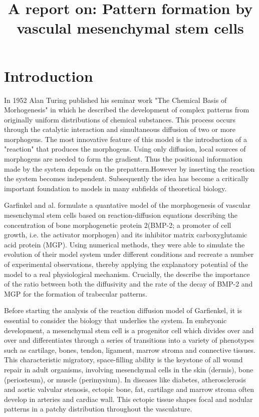 \documentclass[12pt]{article}
\title{A report on: Pattern formation by vasculal mesenchymal stem cells}
\date{\vspace{-5ex}}
\begin{document}
	
	\maketitle
	
	\section{Introduction}
	
  In 1952 Alan Turing published his seminar work "The Chemical Basis of Morhogenesis" in which he described the development of complex patterns from originally uniform distributions of chemical substances. This process occurs through the catalytic interaction and simultaneous diffusion of two or more morphogens. The most innovative feature of this model is the introduction of a "reaction" that produces the morphogens. Using only diffusion, local sources of morphogens are needed to form the gradient. Thus the positional information made by the system depends on the prepattern.However by inserting the reaction the system becomes independent. Subsequently the idea has become a critically important foundation to models in many subfields of theoretical biology.
  
  Garfinkel and al. formulate a quantative model of the morphogenesis of vascular mesenchymal stem cells based on reaction-diffusion equations describing the concentration of bone morphogenetic protein 2(BMP-2; a promoter of cell growth, i.e. the activator morphogen) and its inhibitor matrix carboxyglutamic acid protein (MGP). Using numerical methods, they were able to simulate the evolution of their model system under different conditions and recreate a number of experimental observations, thereby applying the explanatory potential of the model to a real physiological mechanism. Crucially, the describe the importance of the ratio between both the diffusivity and the rate of the decay of BMP-2 and MGP for the formation of trabecular patterns. 
  
  Before starting the analysis of the reaction diffusion model of Garfienkel, it is essential to consider the biology that underlies the system. 
  In embryonic development, a mesenchymal stem cell is a progenitor cell which divides over and over and differentiates through a series of transitions into a variety of phenotypes such as cartilage, bones, tendon, ligament, marrow stroma and connective tissues.
  This characteristic migratory, space-filling ability is the keystone of all wound repair in adult organisms, involving mesenchymal cells in the skin (dermis), bone (periosteum), or muscle (perimysium). In diseases like diabetes, atherosclerosis and aortic valvular stenosis, ectopic bone, fat, cartilage and marrow stroma often develop in arteries and cardiac wall. This ectopic tissue shapes focal and nodular patterns in a patchy distribution throughout the vasculature. 
  
\end{document}

